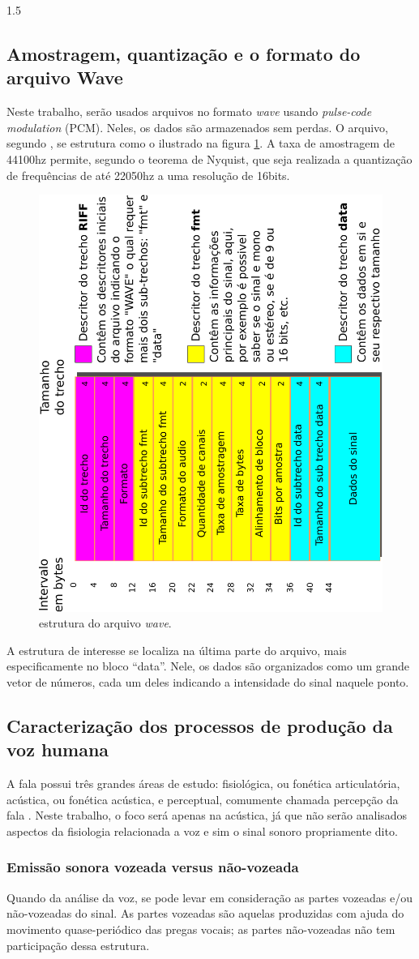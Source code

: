 \documentclass[a4paper,12pt,openright,oneside]{book}
\newenvironment{myenv}[1]
{\begin{spacing}{#1}}
	{\end{spacing}}
\begin{document}
\begin{myenv}{1.5}
\subsection{Amostragem, quantização e o formato do arquivo Wave}
\par Neste trabalho, serão usados arquivos no formato \textit{wave} usando \textit{pulse-code modulation} (PCM). Neles, os dados são armazenados sem perdas. O arquivo, segundo \cite{WAVE2019}, se estrutura como o ilustrado na figura \ref{fig:wavePcmStructure}. A taxa de amostragem de 44100hz permite, segundo o teorema de Nyquist, que seja realizada a quantização de frequências de até 22050hz a uma resolução de 16bits.
\begin{figure}[H]
\centering
\includegraphics[width=0.45\linewidth, angle=-90]{images/wavePcmStructure.pdf}
\caption{estrutura do arquivo \textit{wave}.}
\label{fig:wavePcmStructure}
\end{figure}
\par A estrutura de interesse se localiza na última parte do arquivo, mais especificamente no bloco ``data''. Nele, os dados são organizados como um grande vetor de números, cada um deles indicando a intensidade do sinal naquele ponto.
\subsection{Caracterização dos processos de produção da voz humana}
\par A fala possui três grandes áreas de estudo: fisiológica, ou fonética articulatória, acústica, ou fonética acústica, e  perceptual,  comumente  chamada percepção  da  fala \cite{kremer2014eficiencia}. Neste trabalho, o foco será apenas na acústica, já que não serão analisados aspectos da fisiologia relacionada a voz e sim o sinal sonoro propriamente dito.
\subsubsection{Emissão sonora vozeada versus não-vozeada}
\par Quando da análise da voz, se pode levar em consideração as partes vozeadas e/ou não-vozeadas do sinal. As partes vozeadas são aquelas produzidas com ajuda do movimento quase-periódico das pregas vocais; as partes não-vozeadas não tem participação dessa estrutura.

\end{myenv}
\end{document}
